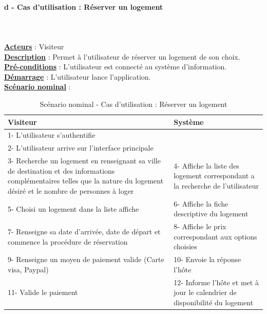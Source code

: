 \paragraph{d - Cas d'utilisation : Réserver un logement} 
$ $\\$ $\\\underline{\textbf{Acteurs}} : Visiteur
\\\underline{\textbf{Description}} : Permet à l’utilisateur de réserver un logement de son choix.
\\\underline{\textbf{Pré-conditions}} : L'utilisateur est connecté au système d’information.
\\\underline{\textbf{Démarrage}} : L’utilisateur lance l’application.
\\\underline{\textbf{Scénario nominal}} :

\begin{table}[H]
\begin{center}
\begin{tabular}{|p{8cm}|p{8cm}|}
\hline
Visiteur & Système\\
\hline
1- L’utilisateur s’authentifie	& $ $\\
\hline
2- L’utilisateur arrive sur l’interface principale & $ $\\
\hline	
3- Recherche un logement en renseignant sa ville de destination et des informations complémentaires telles que la nature du logement désiré et le nombre de personnes à loger & 4- Affiche la liste des logement correspondant a la recherche de l'utilisateur\\
\hline
5- Choisi un logement dans la liste affiche & 6- Affiche la fiche descriptive du logement\\
\hline
7- Renseigne sa date d'arrivée, date de départ et commence la procédure de réservation & 8- Affiche le prix correspondant aux options choisies\\
\hline
9- Renseigne un moyen de paiement valide (Carte visa, Paypal) & 10- Envoie la réponse l'hôte\\
\hline
11- Valide le paiement & 12- Informe l'hôte et met à jour le calendrier de disponibilité du logement\\
\hline
\end{tabular}
\caption{Scénario nominal - Cas d'utilisation : Réserver un logement}
\end{center}
\end{table}

